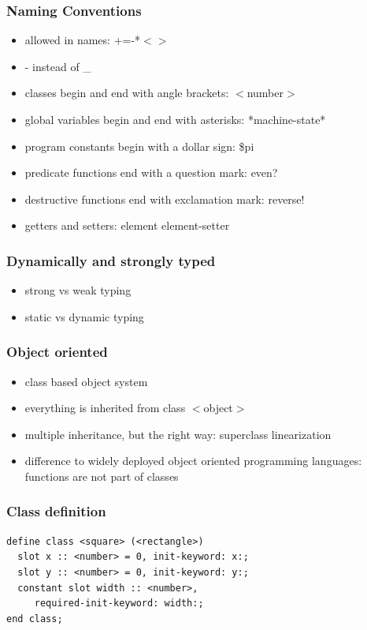 \documentclass[compress]{beamer}
\begin{document}
\begin{frame}
  \frametitle{Naming Conventions}
  \begin{itemize}
  \item allowed in names: +=-*$<>$
  \item - instead of \_
  \item classes begin and end with angle brackets: $<$number$>$
  \item global variables begin and end with asterisks: *machine-state*
  \item program constants begin with a dollar sign: \$pi
  \item predicate functions end with a question mark: even?
  \item destructive functions end with exclamation mark: reverse!
  \item getters and setters: element element-setter
  \end{itemize}
\end{frame} 

\begin{frame}
  \frametitle{Dynamically and strongly typed}
  \begin{itemize}
  \item strong vs weak typing
  \item static vs dynamic typing
  \end{itemize}
\end{frame}

\begin{frame}
  \frametitle{Object oriented}
  \begin{itemize}
  \item class based object system
  \item everything is inherited from class $<$object$>$
  \item multiple inheritance, but the right way: superclass linearization
  \item difference to widely deployed object oriented programming languages: functions are not part of classes
  \end{itemize}
\end{frame}

\begin{frame}[fragile]
  \frametitle{Class definition}
  \begin{verbatim}
define class <square> (<rectangle>)
  slot x :: <number> = 0, init-keyword: x:;
  slot y :: <number> = 0, init-keyword: y:;
  constant slot width :: <number>,
     required-init-keyword: width:;
end class;  
  \end{verbatim}
\end{frame}
\end{document}
